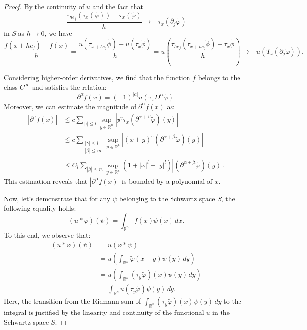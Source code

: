 \begin{proof}
By the continuity of $u$ and the fact that
$$
\frac{\tau_{h e_j}(\tau_x(\tilde{\varphi})) - \tau_x(\tilde{\varphi})}{h} \rightarrow -\tau_x(\partial_j \tilde{\varphi})
$$
in $S$ as $h \rightarrow 0$, we have
    $$
    \frac{f(x+he_j)-f(x)}{h}=\frac{u(\tau_{x+he_j} \tilde{\phi})-u(\tau_x \tilde{\phi})}{h}=u(\frac{\tau_{he_j}( \tau_{x+he_j}\tilde{\phi})-\tau_x \tilde{\phi}}{h}) \rightarrow -u(T_x(\partial_j \tilde{\varphi})).
    $$

Considering higher-order derivatives, we find that the function $f$ belongs to the class $C^{\infty}$ and satisfies the relation:
$$
\partial^\alpha f(x) = (-1)^{|\alpha|} u(\tau_x D^\alpha \tilde{\varphi}).
$$
Moreover, we can estimate the magnitude of $\partial^\alpha f(x)$ as:
$$
\begin{aligned}
|\partial^\alpha f(x)| &\leq c \sum_{|\gamma| \leq l} \sup_{y \in \mathbb{R}^n} |y^\gamma \tau_x(\partial^{\alpha+\beta} \tilde{\varphi})(y)| \\
&\leq c \sum_{\substack{|\gamma| \leq l \\ |\beta| \leq m}} \sup_{y \in \mathbb{R}^n} |(x+y)^\gamma (\partial^{\alpha+\beta} \tilde{\varphi})(y)| \\
&\leq C_l \sum_{|\beta| \leq m} \sup_{y \in \mathbb{R}^n} (1 + |x|^l + |y|^l) |(\partial^{\alpha+\beta} \tilde{\varphi})(y)|.
\end{aligned}
$$
This estimation reveals that $|\partial^\alpha f(x)|$ is bounded by a polynomial of $x$.

Now, let's demonstrate that for any $\psi$ belonging to the Schwartz space $S$, the following equality holds:
$$
(u * \varphi)(\psi) = \int_{\mathbb{R}^n} f(x) \psi(x) \, dx.
$$
To this end, we observe that:
$$
\begin{aligned}
(u * \varphi)(\psi) &= u(\tilde{\varphi} * \psi) \\
&= u\left( \int_{\mathbb{R}^n} \tilde{\varphi}(x-y) \psi(y) \, dy \right) \\
&= u\left( \int_{\mathbb{R}^n} (\tau_y \tilde{\varphi})(x) \psi(y) \, dy \right) \\
&= \int_{\mathbb{R}^n} u(\tau_y \tilde{\varphi}) \psi(y) \, dy.
\end{aligned}
$$
Here, the transition from the Riemann sum of $\int_{\mathbb{R}^n} (\tau_y \tilde{\varphi})(x) \psi(y) \, dy$ to the integral is justified by the linearity and continuity of the functional $u$ in the Schwartz space $S$.
\end{proof}
